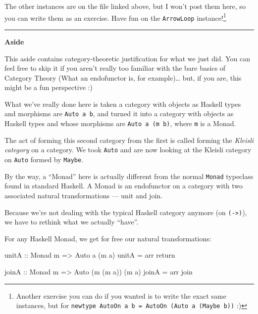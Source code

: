 \documentclass[]{article}
\newenvironment{Shaded}{}{}
\newcommand{\DataTypeTok}[1]{\textcolor[rgb]{0.56,0.13,0.00}{#1}}
\newcommand{\FunctionTok}[1]{\textcolor[rgb]{0.02,0.16,0.49}{#1}}
\newcommand{\NormalTok}[1]{#1}
\newcommand{\OtherTok}[1]{\textcolor[rgb]{0.00,0.44,0.13}{#1}}
\begin{document}
The other instances are on the file linked above, but I won't post them here, so
you can write them as an exercise. Have fun on the \texttt{ArrowLoop}
instance!\footnote{Another exercise you can do if you wanted is to write the
  exact same instances, but for
  \texttt{newtype\ AutoOn\ a\ b\ =\ AutoOn\ (Auto\ a\ (Maybe\ b))} :)}

\begin{center}\rule{0.5\linewidth}{\linethickness}\end{center}

\textbf{Aside}

This aside contains category-theoretic justification for what we just did. You
can feel free to skip it if you aren't really too familiar with the bare basics
of Category Theory (What an endofunctor is, for example)\ldots{} but, if you
are, this might be a fun perspective :)

What we've really done here is taken a category with objects as Haskell types
and morphisms are \texttt{Auto\ a\ b}, and turned it into a category with
objects as Haskell types and whose morphisms are \texttt{Auto\ a\ (m\ b)}, where
\texttt{m} is a Monad.

The act of forming this second category from the first is called forming the
\emph{Kleisli category} on a category. We took \texttt{Auto} and are now looking
at the Kleisli category on \texttt{Auto} formed by \texttt{Maybe}.

By the way, a ``Monad'' here is actually different from the normal
\texttt{Monad} typeclass found in standard Haskell. A Monad is an endofunctor on
a category with two associated natural transformations --- unit and join.

Because we're not dealing with the typical Haskell category anymore (on
\texttt{(-\textgreater{})}), we have to rethink what we actually ``have''.

For any Haskell Monad, we get for free our natural transformations:

\begin{Shaded}
\begin{Highlighting}[]
\OtherTok{unitA ::} \DataTypeTok{Monad}\NormalTok{ m }\OtherTok{=>} \DataTypeTok{Auto}\NormalTok{ a (m a)}
\NormalTok{unitA }\FunctionTok{=}\NormalTok{ arr return}

\OtherTok{joinA ::} \DataTypeTok{Monad}\NormalTok{ m }\OtherTok{=>} \DataTypeTok{Auto}\NormalTok{ (m (m a)) (m a)}
\NormalTok{joinA }\FunctionTok{=}\NormalTok{ arr join}
\end{Highlighting}
\end{Shaded}
\end{document}

